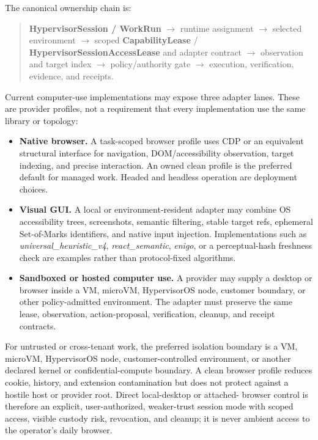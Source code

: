 \documentclass[
  11pt,
]{article}
\providecommand{\tightlist}{%
  \setlength{\itemsep}{0pt}\setlength{\parskip}{0pt}}
\begin{document}
The canonical ownership chain is:

\begin{quote}
\textbf{HypervisorSession / WorkRun} $\rightarrow$ runtime assignment
$\rightarrow$ selected environment $\rightarrow$ scoped
\textbf{CapabilityLease} / \textbf{HypervisorSessionAccessLease} and adapter
contract $\rightarrow$ observation and
target index $\rightarrow$ policy/authority gate $\rightarrow$ execution,
verification, evidence, and receipts.
\end{quote}

Current computer-use implementations may expose three adapter lanes. These are
provider profiles, not a requirement that every implementation use the same
library or topology:

\begin{itemize}
\tightlist
\item
  \textbf{Native browser.} A task-scoped browser profile uses CDP or an
  equivalent structural interface for navigation, DOM/accessibility
  observation, target indexing, and precise interaction. An owned clean profile
  is the preferred default for managed work. Headed and headless operation are
  deployment choices.
\item
  \textbf{Visual GUI.} A local or environment-resident adapter may combine OS
  accessibility trees, screenshots, semantic filtering, stable target refs,
  ephemeral Set-of-Marks identifiers, and native input injection. Implementations
  such as \emph{universal\_heuristic\_v4}, \emph{react\_semantic}, \emph{enigo},
  or a perceptual-hash freshness check are examples rather than protocol-fixed
  algorithms.
\item
  \textbf{Sandboxed or hosted computer use.} A provider may supply a desktop or
  browser inside a VM, microVM, HypervisorOS node, customer boundary, or other
  policy-admitted environment. The adapter must preserve the same lease,
  observation, action-proposal, verification, cleanup, and receipt contracts.
\end{itemize}

For untrusted or cross-tenant work, the preferred isolation boundary is a VM,
microVM, HypervisorOS node, customer-controlled environment, or another
declared kernel or confidential-compute boundary. A clean browser profile
reduces cookie, history, and extension contamination but does not protect
against a hostile host or provider root. Direct local-desktop or attached-
browser control is therefore an explicit, user-authorized, weaker-trust session
mode with scoped access, visible custody risk, revocation, and cleanup; it is
never ambient access to the operator's daily browser.
\end{document}
